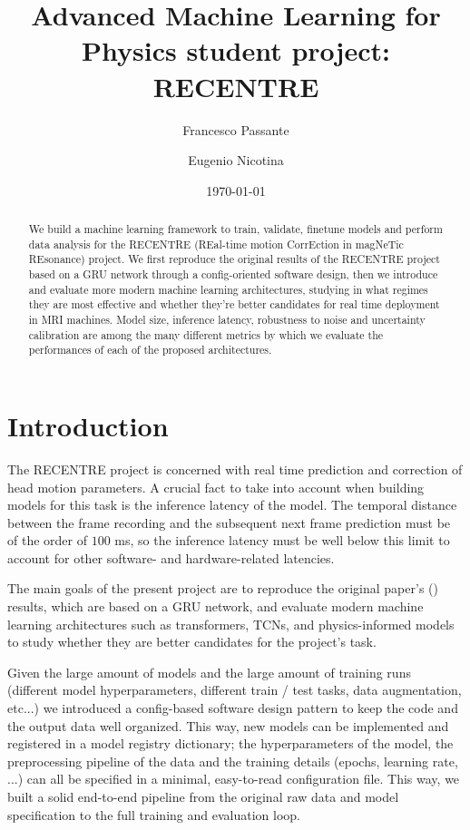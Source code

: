 \documentclass[
reprint,
aps,
prd,
superscriptaddress,
nofootinbib
]{revtex4-2}
\begin{document}
\title{Advanced Machine Learning for Physics student project: RECENTRE}

\author{Francesco Passante}

\author{Eugenio Nicotina}

\date{\today}

\begin{abstract}
We build a machine learning framework to train, validate, finetune models and perform data analysis for the RECENTRE (REal-time motion CorrEction in magNeTic REsonance) project. We first reproduce the original results of the RECENTRE project based on a GRU network through a config-oriented software design, then we introduce and evaluate more modern machine learning architectures, studying in what regimes they are most effective and whether they're better candidates for real time deployment in MRI machines. 
Model size, inference latency, robustness to noise and uncertainty calibration are among the many different metrics by which we evaluate the performances of each of the proposed architectures. 

\end{abstract}

\maketitle

\section{Introduction}

The RECENTRE project is concerned with real time prediction and correction of head motion parameters. A crucial fact to take into account when building models for this task is the inference latency of the model. The temporal distance between the frame recording and the subsequent next frame prediction must be of the order of $100$ ms, so the inference latency must be well below this limit to account for other software- and hardware-related latencies. 

The main goals of the present project are to reproduce the original paper's (\cite{argiento2025realtimemotioncorrectionmagnetic}) results, which are based on a GRU network, and evaluate modern machine learning architectures such as transformers, TCNs, and physics-informed models to study whether they are better candidates for the project's task.

Given the large amount of models and the large amount of training runs (different model hyperparameters, different train / test tasks, data augmentation, etc...) we introduced a config-based software design pattern to keep the code and the output data well organized. This way, new models can be implemented and registered in a model registry dictionary;
the hyperparameters of the model, the preprocessing pipeline of the data and the training details (epochs, learning rate, ...) can all be specified in a minimal, easy-to-read configuration file. This way, we built a solid end-to-end pipeline from the original raw data and model specification to the full training and evaluation loop. 
\end{document}
